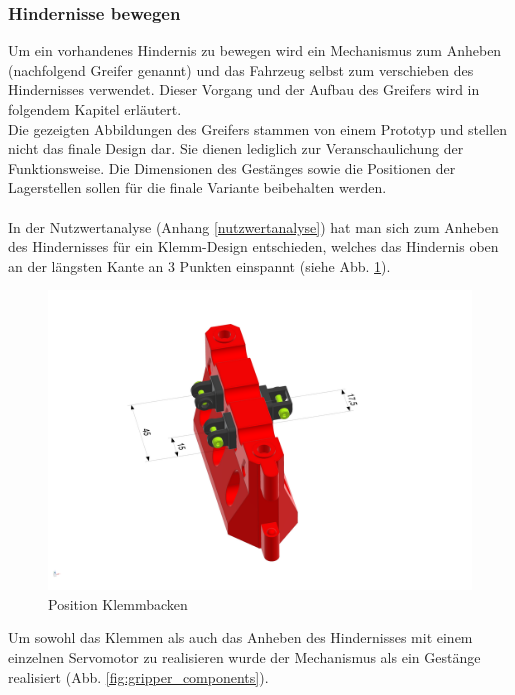 \newpage

\subsubsection{Hindernisse bewegen}
\label{subsubsection:Hindernisse bewegen}

Um ein vorhandenes Hindernis zu bewegen wird ein Mechanismus zum Anheben (nachfolgend Greifer genannt) und das Fahrzeug selbst zum verschieben des Hindernisses verwendet. Dieser Vorgang und der Aufbau des Greifers wird in folgendem Kapitel erläutert.\\

 Die gezeigten Abbildungen des Greifers stammen von einem Prototyp und stellen nicht das finale Design dar. Sie dienen lediglich zur Veranschaulichung der Funktionsweise. Die Dimensionen des Gestänges sowie die Positionen der Lagerstellen sollen für die finale Variante beibehalten werden.\\
 \\
In der Nutzwertanalyse (Anhang \ref{nutzwertanalyse}) hat man sich zum Anheben des Hindernisses für ein Klemm-Design entschieden, welches das Hindernis oben an der längsten Kante an 3 Punkten einspannt (siehe Abb. \ref{fig:obstacle_clamping_concept}). 


\begin{figure}[H]
\centering
\includegraphics[width=0.95\linewidth]{assets/greifer-prototyp/Greifer_Backen_Trimetric.png} 
\caption{Position Klemmbacken}
\label{fig:obstacle_clamping_concept}
\end{figure}

\newpage

Um sowohl das Klemmen als auch das Anheben des Hindernisses mit einem einzelnen Servomotor zu realisieren wurde der Mechanismus als ein Gestänge realisiert (Abb. \ref{fig:gripper_components}).

